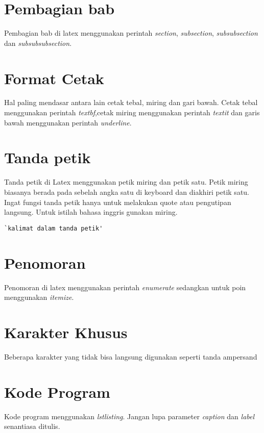 \section{Pembagian bab}
Pembagian bab di latex menggunakan perintah \textit{section}, \textit{subsection}, \textit{subsubsection} dan \textit{subsubsubsection}.


\section{Format Cetak}
Hal paling mendasar antara lain cetak tebal, miring dan gari bawah. Cetak tebal menggunakan perintah \textit{textbf},cetak miring menggunakan perintah \textit{textit} dan garis bawah menggunakan perintah \textit{underline}.

\section{Tanda petik}
Tanda petik di Latex menggunakan petik miring dan petik satu. Petik miring biasanya berada pada sebelah angka satu di keyboard dan diakhiri petik satu. Ingat fungsi tanda petik hanya untuk melakukan quote atau pengutipan langsung. Untuk istilah bahasa inggris gunakan miring.

\begin{lstlisting}[caption=Contoh kalimat dalam tanda petik di Latex,label={lst:tandapetik}]
`kalimat dalam tanda petik'
\end{lstlisting}

\section{Penomoran}
Penomoran di latex menggunakan perintah \textit{enumerate} sedangkan untuk poin menggunakan \textit{itemize}.

\section{Karakter Khusus}
Beberapa karakter yang tidak bisa langsung digunakan seperti tanda ampersand


\section{Kode Program}
Kode program menggunakan \textit{lstlisting}. Jangan lupa parameter \textit{caption} dan \textit{label} senantiasa ditulis.



